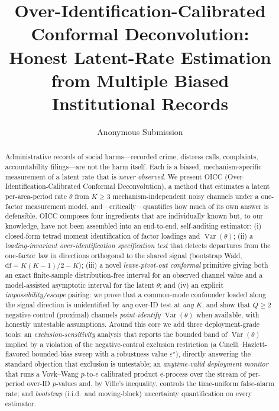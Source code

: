 \documentclass[11pt]{article}
\title{\bf Over-Identification-Calibrated Conformal Deconvolution:\\
Honest Latent-Rate Estimation from Multiple Biased\\ Institutional Records}
\author{%
Anonymous Submission%
}
\date{}
\theoremstyle{definition}
\theoremstyle{remark}
\newcommand{\Var}{\operatorname{Var}}
\newcommand{\eps}{\varepsilon}
\begin{document}
\maketitle

\begin{abstract}
Administrative records of social harms---recorded crime, distress calls,
complaints, accountability filings---are not the harm itself. Each is a
biased, mechanism-specific measurement of a latent rate that is
\emph{never observed}. We present OICC (Over-Identification-Calibrated
Conformal Deconvolution), a method that estimates a latent per-area-period
rate $\theta$ from $K\ge 3$ mechanism-independent noisy channels under a
one-factor measurement model, and---critically---quantifies how much of
its own answer is defensible. OICC composes four ingredients that are
individually known but, to our knowledge, have not been assembled into an
end-to-end, self-auditing estimator: (i) closed-form tetrad moment
identification of factor loadings and $\Var(\theta)$;
(ii) a \emph{loading-invariant over-identification specification test}
that detects departures from the one-factor law in directions orthogonal
to the shared signal (bootstrap Wald, $\mathrm{df}=K(K-1)/2-K$); (iii) a
novel \emph{leave-pivot-out conformal} primitive giving both an
exact finite-sample distribution-free interval for an observed channel
value and a model-assisted asymptotic interval for the latent $\theta$;
and (iv) an explicit \emph{impossibility/escape} pairing: we prove that a
common-mode confounder loaded along the signal direction is unidentified
by \emph{any} over-ID test at \emph{any} $K$, and show that $Q\ge 2$
negative-control (proximal) channels \emph{point-identify} $\Var(\theta)$
when available, with honestly untestable assumptions. Around this core we
add three deployment-grade tools: an \emph{exclusion-sensitivity} analysis
that reports the bounded band of $\Var(\theta)$ implied by a violation of
the negative-control exclusion restriction (a Cinelli--Hazlett-flavored
bounded-bias sweep with a robustness value $\eps^\star$), directly answering
the standard objection that exclusion is untestable; an \emph{anytime-valid
deployment monitor} that runs a Vovk--Wang $p$-to-$e$ calibrated product
e-process over the stream of per-period over-ID $p$-values and, by Ville's
inequality, controls the time-uniform false-alarm rate; and \emph{bootstrap}
(i.i.d.\ and moving-block) uncertainty quantification on every estimator.

\end{abstract}
\end{document}
